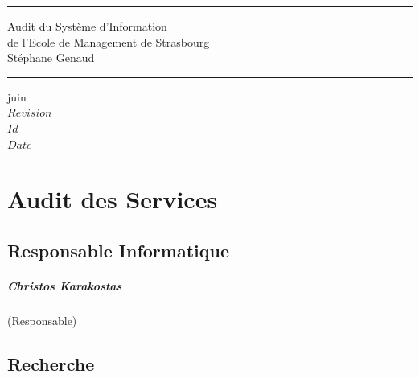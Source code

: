 \documentclass{book}
\begin{document}
\newcommand{\motcle}[1]{\index{#1}{#1}}
\newcommand{\clecommun}{stockage partagé en réseau\xspace}
\newcommand{\sre}{service relations entreprises\xspace}
\newcommand{\sop}{service organisation et process\xspace}
\newcommand{\scom}{service communication\xspace}
\newcommand{\sconc}{service concours\xspace}
\newcommand{\sintl}{service international\xspace}
\newcommand{\CK}{Christos Karacostas\xspace}


\thispagestyle{empty}
\rhead[]{}
\pagestyle{fancy}
\setlength{\parindent}{0mm}
\setlength{\parskip}{0mm}
\rule{\linewidth}{1mm}
\begin{center}
\Large{Audit du Système d'Information}\\[5mm]
\Large{de l'Ecole de Management de Strasbourg}\\[5mm]
\large{Stéphane Genaud}
\rule{\linewidth}{1mm}
\end{center}
\begin{center}
juin  \\
\textrm{
$Revision$\\
$Id$\\
$Date$\\
}
\end{center}

\tableofcontents
\newpage

 
 

\chapter{Audit des Services}
 

\section{Responsable Informatique}

\paragraph{Christos Karakostas} (Responsable)


\section{Recherche}
\end{document}
